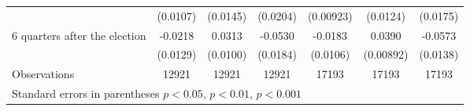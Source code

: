 \begin{table}[!ht]
\begin{tabular}{l*{6}{c}}
                    &    (0.0107)         &    (0.0145)         &    (0.0204)         &   (0.00923)         &    (0.0124)         &    (0.0175)         \\
[0,5em]
 6 quarters after the election&     -0.0218         &      0.0313\sym{**} &     -0.0530\sym{**} &     -0.0183         &      0.0390\sym{***}&     -0.0573\sym{***}\\
                    &    (0.0129)         &    (0.0100)         &    (0.0184)         &    (0.0106)         &   (0.00892)         &    (0.0138)         \\
\hline
Observations        &       12921         &       12921         &       12921         &       17193         &       17193         &       17193         \\
\hline\hline
\multicolumn{7}{l}{\footnotesize Standard errors in parentheses \sym{*} \(p<0.05\), \sym{**} \(p<0.01\), \sym{***} \(p<0.001\)}\\
\end{tabular}
\end{table}
